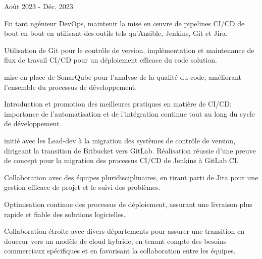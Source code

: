 \begin{cventries}
            {Août 2023 - Déc. 2023} %
            {
              \begin{cvitems} %
                \item {En tant ngénieur DevOps, maintenir la mise en œuvre de pipelines CI/CD de bout en bout en utilisant des outils tels qu'Ansible, Jenkins, Git et Jira.}
                \item {Utilisation de Git pour le contrôle de version, implémentation et maintenance de flux de travail CI/CD pour un déploiement efficace du code solution.}
                \item {mise en place  de SonarQube pour l'analyse de la qualité du code, améliorant l'ensemble du processus de développement.}
                \item {Introduction et promotion des meilleures pratiques en matière de CI/CD: importance de l'automatisation et de l'intégration continue tout au long du cycle de développement.}
                \item {initié avec les Lead-dev à la migration des systèmes de contrôle de version, dirigeant la transition de Bitbucket vers GitLab. Réalisation réussie d'une preuve de concept pour la migration des processus CI/CD de Jenkins à GitLab CI.}
                \item {Collaboration avec des équipes pluridisciplinaires, en tirant parti de Jira pour une gestion efficace de projet et le suivi des problèmes.}
                \item {Optimisation continue des processus de déploiement, assurant une livraison plus rapide et fiable des solutions logicielles.}
                \item {Collaboration étroite avec divers départements pour assurer une transition en douceur vers un modèle de cloud hybride, en tenant compte des besoins commerciaux spécifiques et en favorisant la collaboration entre les équipes.}
              \end{cvitems}
                
            }


\end{cventries}
